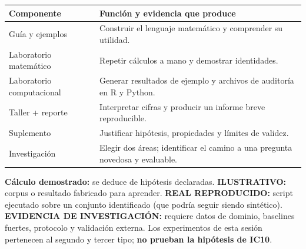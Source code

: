 \begin{center}\small
\begin{tabular}{p{}p{}}
\toprule
\textbf{Componente} & \textbf{Función y evidencia que produce}\\\midrule
Guía y ejemplos & Construir el lenguaje matemático y comprender su utilidad.\\
Laboratorio matemático & Repetir cálculos a mano y demostrar identidades.\\
Laboratorio computacional & Generar resultados de ejemplo y archivos de auditoría en R y Python.\\
Taller + reporte & Interpretar cifras y producir un informe breve reproducible.\\
Suplemento & Justificar hipótesis, propiedades y límites de validez.\\
Investigación & Elegir dos áreas; identificar el camino a una pregunta novedosa y evaluable.\\\bottomrule
\end{tabular}
\end{center}
\begin{contraste}
\textbf{Cálculo demostrado:} se deduce de hipótesis declaradas.
\textbf{ILUSTRATIVO:} corpus o resultado fabricado para aprender.
\textbf{REAL REPRODUCIDO:} script ejecutado sobre un conjunto identificado
(que podría seguir siendo sintético).
\textbf{EVIDENCIA DE INVESTIGACIÓN:} requiere datos de dominio,
baselines fuertes, protocolo y validación externa. Los experimentos de esta
sesión pertenecen al segundo y tercer tipo; \textbf{no prueban la hipótesis de IC10}.
\end{contraste}
